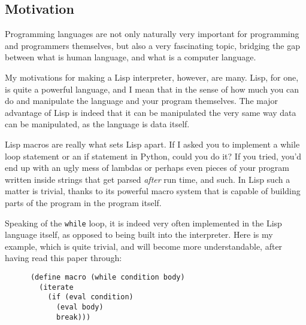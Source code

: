 \documentclass{article}
\newcommand{\code}[1]{\texttt{#1}}
\begin{document}
  \subsection{Motivation}
    Programming languages are not only naturally very important for programming
    and programmers themselves,
    but also a very fascinating topic, bridging the gap between
    what is human language, and what is a computer language.


    My motivations for making a Lisp interpreter, however, are many.
    Lisp, for one, is quite a powerful language, and I mean that in the sense
    of how much you can do and manipulate the language and your program themselves.
    The major advantage of Lisp is indeed that it can be manipulated the very
    same way data can be manipulated, as the language is data itself.

    Lisp macros are really what sets Lisp apart. If I asked you to implement
    a while loop statement or an if statement in Python, could you do it?
    If you tried, you'd end up with an ugly mess of lambdas or perhaps even pieces
    of your program written inside strings that get parsed \emph{after} run time, and
    such.  In Lisp such a matter is trivial, thanks to its powerful macro system
    that is capable of building parts of the program in the program itself.

    \clearpage

    Speaking of the \code{while} loop, it is indeed very often implemented
    in the Lisp language itself, as opposed to being built into the interpreter.
    Here is my example, which is quite trivial, and will become more
    understandable, after having read this paper through:

    \begin{verbatim}
      (define macro (while condition body)
        (iterate
          (if (eval condition)
            (eval body)
            break)))
    \end{verbatim}
\end{document}
